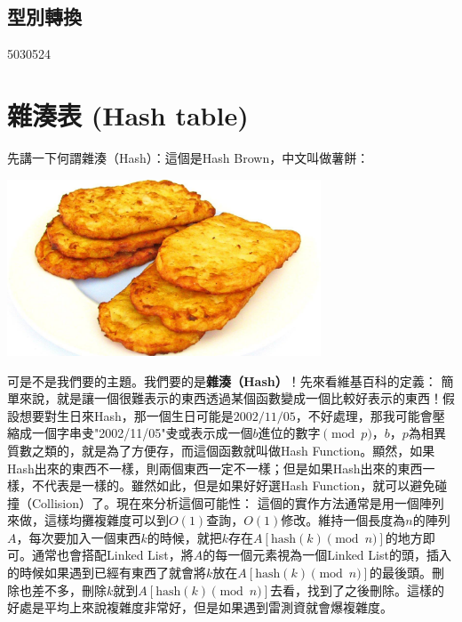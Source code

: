 \documentclass[main.tex]{subfiles}
\begin{document}
\subsection{型別轉換}
\begin{C++}5030524\end{C++}
\section{雜湊表 (Hash table)}
先講一下何謂雜湊（Hash）：這個是Hash Brown，中文叫做薯餅：
\begin{center}
\includegraphics*[width = 0.7\textwidth]{images/hashbrown.jpg}
\end{center}
可是不是我們要的主題。我們要的是\textbf{雜湊（Hash）}！先來看維基百科的定義：
簡單來說，就是讓一個很難表示的東西透過某個函數變成一個比較好表示的東西！假設想要對生日來Hash，那一個生日可能是$2002/11/05$，不好處理，那我可能會壓縮成一個字串叏"2002/11/05"叏或表示成一個$b$進位的數字$\pmod p$，$b$，$p$為相異質數之類的，就是為了方便存，而這個函數就叫做Hash Function。顯然，如果Hash出來的東西不一樣，則兩個東西一定不一樣；但是如果Hash出來的東西一樣，不代表是一樣的。雖然如此，但是如果好好選Hash Function，就可以避免碰撞（Collision）了。現在來分析這個可能性：
這個的實作方法通常是用一個陣列來做，這樣均攤複雜度可以到$O(1)$查詢，$O(1)$修改。維持一個長度為$n$的陣列$A$，每次要加入一個東西$k$的時候，就把$k$存在$A[\text{hash}(k) \pmod n]$的地方即可。通常也會搭配Linked List，將$A$的每一個元素視為一個Linked List的頭，插入的時候如果遇到已經有東西了就會將$k$放在$A[\text{hash}(k) \pmod n]$的最後頭。刪除也差不多，刪除$k$就到$A[\text{hash}(k) \pmod n]$去看，找到了之後刪除。這樣的好處是平均上來說複雜度非常好，但是如果遇到雷測資就會爆複雜度。
\end{document}
